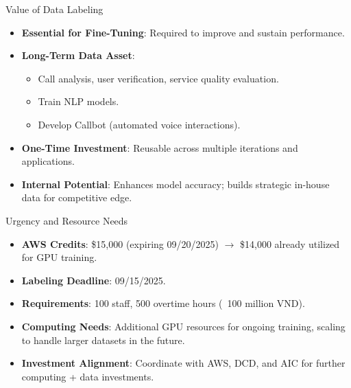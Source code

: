 \documentclass{beamer}
\begin{document}
\begin{frame}{Value of Data Labeling}
    \begin{itemize}
        \item \textbf{Essential for Fine-Tuning}: Required to improve and sustain performance.
        \item \textbf{Long-Term Data Asset}:
            \begin{itemize}
                \item Call analysis, user verification, service quality evaluation.
                \item Train NLP models.
                \item Develop Callbot (automated voice interactions).
            \end{itemize}
        \item \textbf{One-Time Investment}: Reusable across multiple iterations and applications.
        \item \textbf{Internal Potential}: Enhances model accuracy; builds strategic in-house data for competitive edge.
    \end{itemize}
\end{frame}

\begin{frame}{Urgency and Resource Needs}
    \begin{itemize}
        \item \textbf{AWS Credits}: \$15,000 (expiring 09/20/2025) $\to$ \$14,000 already utilized for GPU training.
        \item \textbf{Labeling Deadline}: 09/15/2025.
        \item \textbf{Requirements}: 100 staff, 500 overtime hours (~100 million VND).
        \item \textbf{Computing Needs}: Additional GPU resources for ongoing training, scaling to handle larger datasets in the future.
        \item \textbf{Investment Alignment}: Coordinate with AWS, DCD, and AIC for further computing + data investments.
    \end{itemize}
\end{frame}
\end{document}
